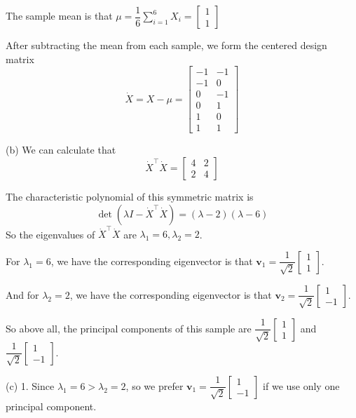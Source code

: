 \documentclass[10pt]{article}
\begin{document}
\begin{enumerate}[1.]
The sample mean is that $\mu=\dfrac{1}{6}\sum\limits_{i=1}^6 X_i=\left[\begin{array}{l}
  1 \\
  1
  \end{array}\right]$

After subtracting the mean from each sample, we form the centered design matrix
$$\dot{X}=X-\mu=
\begin{bmatrix}
  -1 & -1 \\
  -1 & 0 \\
  0 & -1 \\
  0 & 1 \\
  1 & 0 \\
  1 & 1 
\end{bmatrix}
$$

(b) We can calculate that
$$\dot{X}^{\top} \dot{X}=
\begin{bmatrix}
  4 & 2 \\
  2 & 4
\end{bmatrix}$$

The characteristic polynomial of this symmetric matrix is
$$\det(\lambda I - \dot{X}^{\top} \dot{X})=(\lambda-2)(\lambda-6)$$
So the eigenvalues of $\dot{X}^{\top} \dot{X}$ are $\lambda_1=6, \lambda_2=2$.

For $\lambda_1=6$, we have the corresponding eigenvector is that $\mathbf{v}_1=
\dfrac{1}{\sqrt{2}}\begin{bmatrix}
  1 \\
  1
\end{bmatrix}$.

And for $\lambda_2=2$, we have the corresponding eigenvector is that $\mathbf{v}_2=
\dfrac{1}{\sqrt{2}}\begin{bmatrix}
  1 \\
  -1
\end{bmatrix}$.

So above all, the principal components of this sample are 
$\dfrac{1}{\sqrt{2}}\begin{bmatrix}
  1 \\
  1
\end{bmatrix}$ and 
$\dfrac{1}{\sqrt{2}}\begin{bmatrix}
  1 \\
  -1
\end{bmatrix}$.

(c) 1. Since $\lambda_1=6>\lambda_2=2$, so we prefer $\mathbf{v}_1=\dfrac{1}{\sqrt{2}}\begin{bmatrix}
  1 \\
  -1
\end{bmatrix}$ if we use only one principal component.\\


\end{enumerate}
\end{document}
